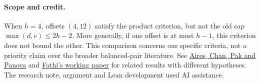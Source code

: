 \documentclass[11pt,letterpaper]{article}
\begin{document}
\paragraph{Scope and credit.}
When \(h=4\), offsets \((4,12)\) satisfy the product criterion, but
not the old cap \(\max(d,e)\le 2h-2\). More generally, if one
offset is at most \(h-1\), this criterion does not bound the other.
This comparison concerns our specific criteria, not a priority claim
over the broader balanced-pair literature. See
\href{https://arxiv.org/abs/2609.30888}{Aires, Chan, Pak and Panova}
and \href{https://zenodo.org/records/24357683}{Fathi's working paper}
for related results with different hypotheses. The research note,
argument and Lean development used AI assistance.
\end{document}
